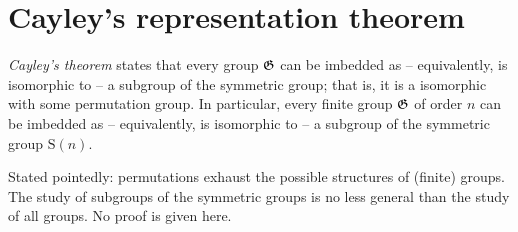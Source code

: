 \section{Cayley's representation theorem}
{\em Cayley's theorem} states that every group ${\frak G}$ can be imbedded as
--
equivalently, is isomorphic to -- a subgroup
of the symmetric group; that is, it is a isomorphic with some permutation group.
In particular, every finite group ${\frak G}$ of order $n$  can be imbedded as
--
equivalently, is isomorphic to -- a subgroup
of the symmetric group $\textrm{S}(n)$.

Stated pointedly: permutations exhaust the possible structures of (finite) groups.
The study of subgroups of the symmetric groups is no less general than the study of all groups.
No proof is given here.






\begin{center}
{\color{olive}   \Huge
 \decosix
}
\end{center}
